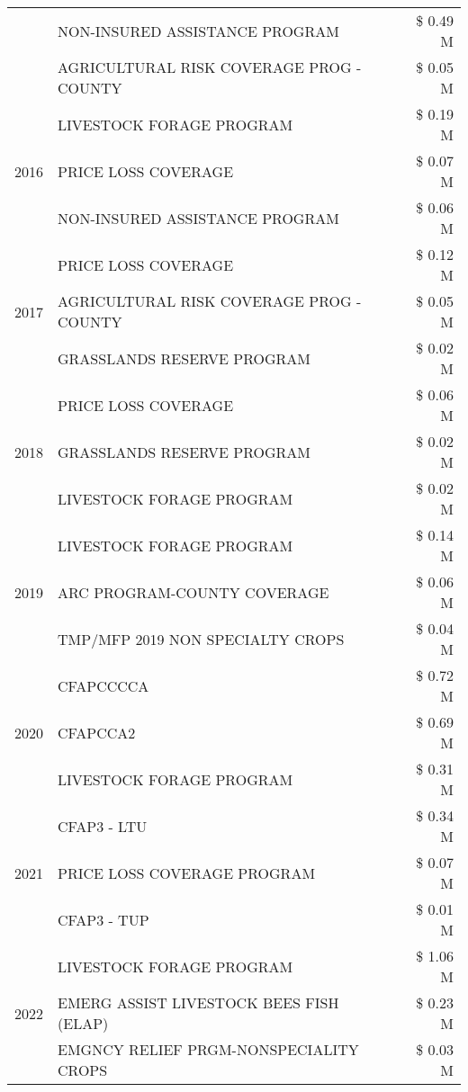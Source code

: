 \begin{tabular}{llr}
 & NON-INSURED ASSISTANCE PROGRAM & \$ 0.49 M \\
 & AGRICULTURAL RISK COVERAGE PROG - COUNTY & \$ 0.05 M \\
\cline{1-3}
\multirow[t]{3}{*}{2016} & LIVESTOCK FORAGE PROGRAM & \$ 0.19 M \\
 & PRICE LOSS COVERAGE & \$ 0.07 M \\
 & NON-INSURED ASSISTANCE PROGRAM & \$ 0.06 M \\
\cline{1-3}
\multirow[t]{3}{*}{2017} & PRICE LOSS COVERAGE & \$ 0.12 M \\
 & AGRICULTURAL RISK COVERAGE PROG - COUNTY & \$ 0.05 M \\
 & GRASSLANDS RESERVE PROGRAM & \$ 0.02 M \\
\cline{1-3}
\multirow[t]{3}{*}{2018} & PRICE LOSS COVERAGE & \$ 0.06 M \\
 & GRASSLANDS RESERVE PROGRAM & \$ 0.02 M \\
 & LIVESTOCK FORAGE PROGRAM & \$ 0.02 M \\
\cline{1-3}
\multirow[t]{3}{*}{2019} & LIVESTOCK FORAGE PROGRAM & \$ 0.14 M \\
 & ARC PROGRAM-COUNTY COVERAGE & \$ 0.06 M \\
 & TMP/MFP 2019 NON SPECIALTY CROPS & \$ 0.04 M \\
\cline{1-3}
\multirow[t]{3}{*}{2020} & CFAPCCCCA & \$ 0.72 M \\
 & CFAPCCA2 & \$ 0.69 M \\
 & LIVESTOCK FORAGE PROGRAM & \$ 0.31 M \\
\cline{1-3}
\multirow[t]{3}{*}{2021} & CFAP3 - LTU & \$ 0.34 M \\
 & PRICE LOSS COVERAGE PROGRAM & \$ 0.07 M \\
 & CFAP3 - TUP & \$ 0.01 M \\
\cline{1-3}
\multirow[t]{3}{*}{2022} & LIVESTOCK FORAGE PROGRAM & \$ 1.06 M \\
 & EMERG ASSIST LIVESTOCK BEES FISH (ELAP) & \$ 0.23 M \\
 & EMGNCY RELIEF PRGM-NONSPECIALITY CROPS & \$ 0.03 M \\
\cline{1-3}
\bottomrule
\end{tabular}
